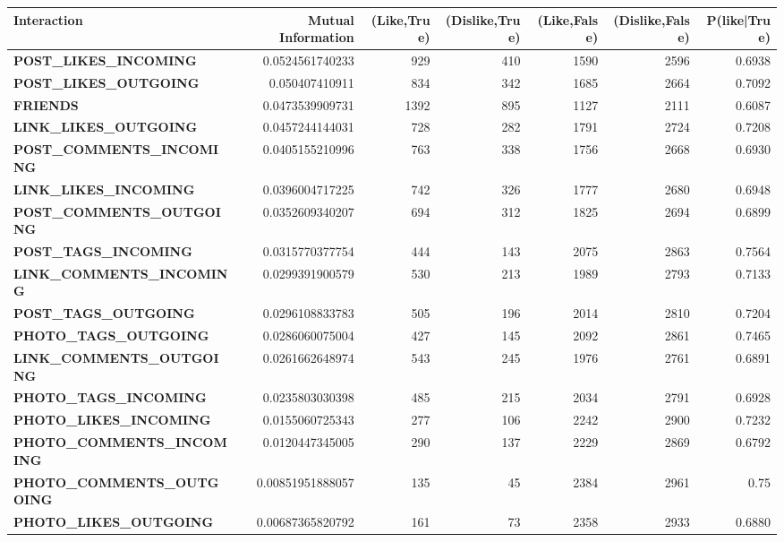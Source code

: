 \begin{table}
	\centering
	\begin{tabular}{| >{\small}l | >{\small}r | >{\small}r | >{\small}r | >{\small}r | >{\small}r | >{\small}r |}
	\hline
	Interaction & Mutual Information & (Like,True) & (Dislike,True) & (Like,False) & (Dislike,False)& P(like|True)\\
	\hline
	\textbf{POST\_LIKES\_INCOMING} & 0.0524561740233 & 929 & 410 & 1590 & 2596 & 0.6938\\
	\hline
	\textbf{POST\_LIKES\_OUTGOING}& 0.050407410911 & 834 & 342 & 1685 & 2664 & 0.7092\\
	\hline
	\textbf{FRIENDS} & 0.0473539909731 & 1392 & 895 & 1127 & 2111 & 0.6087\\
	\hline
	\textbf{LINK\_LIKES\_OUTGOING}& 0.0457244144031 & 728 & 282 & 1791 & 2724 & 0.7208\\
	\hline
	\textbf{POST\_COMMENTS\_INCOMING}& 0.0405155210996 & 763 & 338 & 1756 & 2668& 0.6930\\
	\hline
	\textbf{LINK\_LIKES\_INCOMING}& 0.0396004717225 & 742 & 326 & 1777 & 2680 & 0.6948\\
	\hline
	\textbf{POST\_COMMENTS\_OUTGOING}& 0.0352609340207 & 694 & 312 & 1825 & 2694 & 0.6899\\
	\hline
	\textbf{POST\_TAGS\_INCOMING}& 0.0315770377754 & 444 & 143 & 2075 & 2863 & 0.7564\\
	\hline
	\textbf{LINK\_COMMENTS\_INCOMING}& 0.0299391900579 & 530 & 213 & 1989 & 2793 & 0.7133 \\
	\hline
	\textbf{POST\_TAGS\_OUTGOING}& 0.0296108833783 & 505 & 196 & 2014 & 2810 & 0.7204\\
	\hline
	\textbf{PHOTO\_TAGS\_OUTGOING}& 0.0286060075004 & 427 & 145 & 2092 & 2861 & 0.7465\\
	\hline
	\textbf{LINK\_COMMENTS\_OUTGOING}& 0.0261662648974 & 543 & 245 & 1976 & 2761 & 0.6891\\
	\hline
	\textbf{PHOTO\_TAGS\_INCOMING}& 0.0235803030398 & 485 & 215 & 2034 & 2791 & 0.6928\\
	\hline
	\textbf{PHOTO\_LIKES\_INCOMING}& 0.0155060725343 & 277 & 106 & 2242 & 2900 & 0.7232\\
	\hline
	\textbf{PHOTO\_COMMENTS\_INCOMING}& 0.0120447345005 & 290 & 137 & 2229 & 2869 & 0.6792\\
	\hline
	\textbf{PHOTO\_COMMENTS\_OUTGOING}& 0.00851951888057 & 135 & 45 & 2384 & 2961& 0.75\\
	\hline
	\textbf{PHOTO\_LIKES\_OUTGOING}& 0.00687365820792 & 161 & 73 & 2358 & 2933 & 0.6880\\

\end{tabular}
\end{table}

